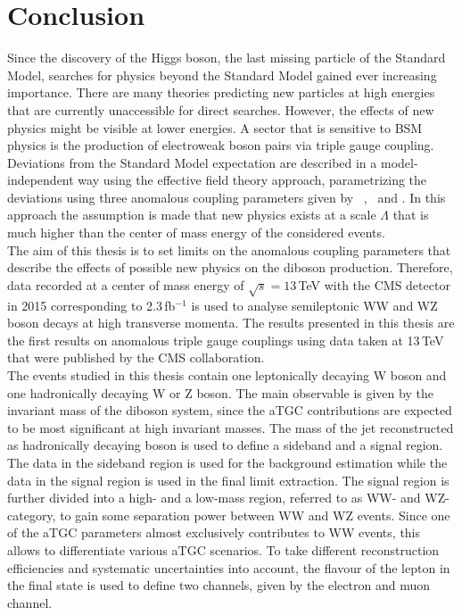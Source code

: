 \chapter{Conclusion}
\label{ch:Conclusion}
Since the discovery of the Higgs boson, the last missing particle of the Standard Model, searches for physics beyond the Standard Model gained ever increasing importance. There are many theories predicting new particles at high energies that are currently unaccessible for direct searches. However, the effects of new physics might be visible at lower energies. A sector that is sensitive to BSM physics is the production of electroweak boson pairs via triple gauge coupling. Deviations from the Standard Model expectation are described in a model-independent way using the effective field theory approach, parametrizing the deviations using three anomalous coupling parameters given by \Tcwww \ , \Tccw \ and \Tcb . In this approach the assumption is made that new physics exists at a scale $\Lambda$ that is much higher than the center of mass energy of the considered events.\\

The aim of this thesis is to set limits on the anomalous coupling parameters that describe the effects of possible new physics on the diboson production. Therefore, data recorded at a center of mass energy of $\sqrt{s}=13$\,TeV with the CMS detector in 2015 corresponding to 2.3\,fb$^{-1}$ is used to analyse semileptonic WW and WZ boson decays at high transverse momenta. The results presented in this thesis are the first results on anomalous triple gauge couplings using data taken at 13\,TeV that were published by the CMS collaboration.\\

The events studied in this thesis contain one leptonically decaying W boson and one hadronically decaying W or Z boson. The main observable is given by the invariant mass of the diboson system, since the aTGC contributions are expected to be most significant at high invariant masses. The mass of the jet reconstructed as hadronically decaying boson is used to define a sideband and a signal region. The data in the sideband region is used for the background estimation while the data in the signal region is used in the final limit extraction. The signal region is further divided into a high- and a low-mass region, referred to as WW- and WZ-category, to gain some separation power between WW and WZ events. Since one of the aTGC parameters almost exclusively contributes to WW events, this allows to differentiate various aTGC scenarios. To take different reconstruction efficiencies and systematic uncertainties into account, the flavour of the lepton in the final state is used to define two channels, given by the electron and muon channel.\\

